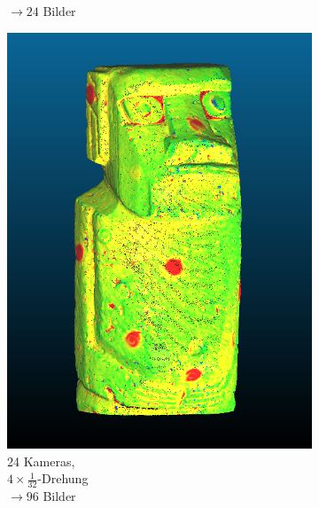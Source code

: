 \documentclass[./00PhotoBox.tex]{subfiles}
\begin{document}
\begin{figure}
\begin{subfigure}{0.30\textwidth}
{            $\rightarrow 24$ Bilder
        }
        \label{img:moai_normal}
    \end{subfigure}
    \begin{subfigure}{0.30\textwidth}
        \includegraphics[width=1\linewidth]{img/7_versuche/cam_anzahl/feinschritt.png}
        \centering
        \caption{
            24 Kameras,\\
            $4 \times \frac{1}{32}$-Drehung\\
            $\rightarrow 96$ Bilder
        }
        \label{img:moai_feinschritt}
    \end{subfigure}
    \begin{subfigure}{0.30\textwidth}

\end{subfigure}
\end{figure}
\end{document}
